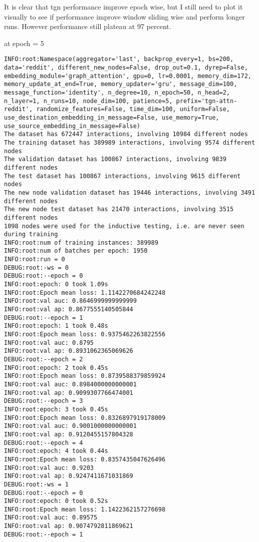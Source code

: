 \documentclass[11pt]{article}
\begin{document}
It is clear that tgn performance improve epoch wise, but I still need to plot it visually to see if performance improve window sliding wise and perform longer runs. However performance still plateau at 97 percent.

at epoch = 5
\begin{verbatim}
INFO:root:Namespace(aggregator='last', backprop_every=1, bs=200, data='reddit', different_new_nodes=False, drop_out=0.1, dyrep=False, embedding_module='graph_attention', gpu=0, lr=0.0001, memory_dim=172, memory_update_at_end=True, memory_updater='gru', message_dim=100, message_function='identity', n_degree=10, n_epoch=50, n_head=2, n_layer=1, n_runs=10, node_dim=100, patience=5, prefix='tgn-attn-reddit', randomize_features=False, time_dim=100, uniform=False, use_destination_embedding_in_message=False, use_memory=True, use_source_embedding_in_message=False)
The dataset has 672447 interactions, involving 10984 different nodes
The training dataset has 389989 interactions, involving 9574 different nodes
The validation dataset has 100867 interactions, involving 9839 different nodes
The test dataset has 100867 interactions, involving 9615 different nodes
The new node validation dataset has 19446 interactions, involving 3491 different nodes
The new node test dataset has 21470 interactions, involving 3515 different nodes
1098 nodes were used for the inductive testing, i.e. are never seen during training
INFO:root:num of training instances: 389989
INFO:root:num of batches per epoch: 1950
INFO:root:run = 0
DEBUG:root:-ws = 0
DEBUG:root:--epoch = 0
INFO:root:epoch: 0 took 1.09s
INFO:root:Epoch mean loss: 1.1142270684242248
INFO:root:val auc: 0.8646999999999999
INFO:root:val ap: 0.8677555140505844
DEBUG:root:--epoch = 1
INFO:root:epoch: 1 took 0.48s
INFO:root:Epoch mean loss: 0.9375462263822556
INFO:root:val auc: 0.8795
INFO:root:val ap: 0.8931062365069626
DEBUG:root:--epoch = 2
INFO:root:epoch: 2 took 0.45s
INFO:root:Epoch mean loss: 0.8739588379859924
INFO:root:val auc: 0.8984000000000001
INFO:root:val ap: 0.9099307766474001
DEBUG:root:--epoch = 3
INFO:root:epoch: 3 took 0.45s
INFO:root:Epoch mean loss: 0.8326897919178009
INFO:root:val auc: 0.9001000000000001
INFO:root:val ap: 0.9120455157804328
DEBUG:root:--epoch = 4
INFO:root:epoch: 4 took 0.44s
INFO:root:Epoch mean loss: 0.8357435047626496
INFO:root:val auc: 0.9203
INFO:root:val ap: 0.9247411671031869
DEBUG:root:-ws = 1
DEBUG:root:--epoch = 0
INFO:root:epoch: 0 took 0.52s
INFO:root:Epoch mean loss: 1.1422362157276698
INFO:root:val auc: 0.89575
INFO:root:val ap: 0.9074792811869621
DEBUG:root:--epoch = 1

\end{verbatim}
\end{document}
